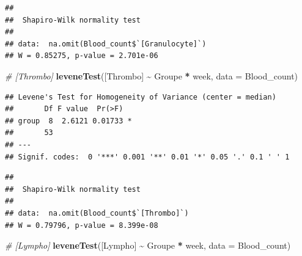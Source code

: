 \documentclass[
]{article}
\newenvironment{Shaded}{\begin{snugshade}}{\end{snugshade}}
\newcommand{\AttributeTok}[1]{\textcolor[rgb]{0.13,0.29,0.53}{#1}}
\newcommand{\CommentTok}[1]{\textcolor[rgb]{0.56,0.35,0.01}{\textit{#1}}}
\newcommand{\FunctionTok}[1]{\textcolor[rgb]{0.13,0.29,0.53}{\textbf{#1}}}
\newcommand{\NormalTok}[1]{#1}
\newcommand{\SpecialCharTok}[1]{\textcolor[rgb]{0.81,0.36,0.00}{\textbf{#1}}}
\newcommand{\StringTok}[1]{\textcolor[rgb]{0.31,0.60,0.02}{#1}}
\begin{document}
\begin{Shaded}
\end{Shaded}

\begin{verbatim}
## 
##  Shapiro-Wilk normality test
## 
## data:  na.omit(Blood_count$`[Granulocyte]`)
## W = 0.85275, p-value = 2.701e-06
\end{verbatim}

\begin{Shaded}
\begin{Highlighting}[]
\CommentTok{\# [Thrombo]}
\FunctionTok{leveneTest}\NormalTok{(}\StringTok{\textasciigrave{}}\AttributeTok{[Thrombo]}\StringTok{\textasciigrave{}} \SpecialCharTok{\textasciitilde{}}\NormalTok{ Groupe }\SpecialCharTok{*}\NormalTok{ week, }\AttributeTok{data =}\NormalTok{ Blood\_count)}
\end{Highlighting}
\end{Shaded}

\begin{verbatim}
## Levene's Test for Homogeneity of Variance (center = median)
##       Df F value  Pr(>F)  
## group  8  2.6121 0.01733 *
##       53                  
## ---
## Signif. codes:  0 '***' 0.001 '**' 0.01 '*' 0.05 '.' 0.1 ' ' 1
\end{verbatim}

\begin{Shaded}
\end{Shaded}

\begin{verbatim}
## 
##  Shapiro-Wilk normality test
## 
## data:  na.omit(Blood_count$`[Thrombo]`)
## W = 0.79796, p-value = 8.399e-08
\end{verbatim}

\begin{Shaded}
\begin{Highlighting}[]
\CommentTok{\# [Lympho]}
\FunctionTok{leveneTest}\NormalTok{(}\StringTok{\textasciigrave{}}\AttributeTok{[Lympho]}\StringTok{\textasciigrave{}} \SpecialCharTok{\textasciitilde{}}\NormalTok{ Groupe }\SpecialCharTok{*}\NormalTok{ week, }\AttributeTok{data =}\NormalTok{ Blood\_count)}
\end{Highlighting}
\end{Shaded}
\end{document}
